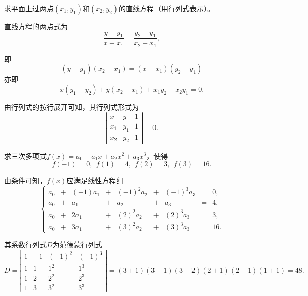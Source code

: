 \begin{frame}



\begin{testexample}
  求平面上过两点$(x_1,y_1)$和$(x_2,y_2)$的直线方程（用行列式表示）。
\end{testexample}\pause

\begin{jie}
直线方程的两点式为
$$
\frac{y-y_1}{x-x_1}=\frac{y_2-y_1}{x_2-x_1},
$$

即
$$
(y-y_1)(x_2-x_1)=(x-x_1)(y_2-y_1)
$$
亦即
$$
x(y_1-y_2)+y(x_2-x_1)+x_1y_2-x_2y_1=0.
$$

由行列式的按行展开可知，其行列式形式为
$$
\left|
  \begin{array}{ccc}
    x&y&1\\
    x_1&y_1&1\\
    x_2&y_2&1      
  \end{array}
\right|=0.
$$
\end{jie}
\end{frame}

\begin{frame}


\begin{testexample}
  求三次多项式$f(x)=a_0+a_1x+a_2x^2+a_3x^3$，使得
  $$
  f(-1)=0,~~f(1)=4,~~f(2)=3,~~f(3)=16.
  $$
\end{testexample}\pause

\begin{jie}
由条件可知，$f(x)$应满足线性方程组
$$
\left\{
  \begin{array}{rcrcrcrcrcr}
    a_0&+&(-1)a_1&+&(-1)^2a_2&+&(-1)^3a_3&=&0, \\[0.2cm]
    a_0&+&    a_1&+&      a_2&+&      a_3&=&4, \\[0.2cm]
    a_0&+&  2 a_1&+&( 2)^2a_2&+&( 2)^3a_3&=&3, \\[0.2cm]
    a_0&+&  3 a_1&+&( 3)^2a_2&+&( 3)^3a_3&=&16.
  \end{array}
\right.
$$

其系数行列式$D$为范德蒙行列式
$$
D = \left|
  \begin{array}{cccc}
    1& -1&(-1)^2&(-1)^3\\[0.1cm]
    1&  1&   1^2&1^3\\[0.1cm]
    1&  2&   2^2&2^3\\[0.1cm]
    1&  3&   3^2&3^3
  \end{array}
\right| 
= (3+1)(3-1)(3-2)(2+1)(2-1)(1+1) = 48.
$$
\end{jie}


\end{frame}


